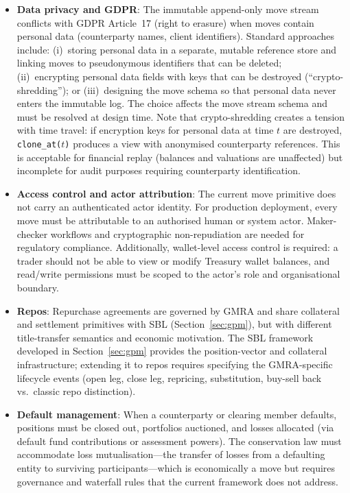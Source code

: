 \documentclass[11pt,a4paper]{article}
\begin{document}
\begin{itemize}
\item \textbf{Data privacy and GDPR}: The immutable append-only move stream conflicts with GDPR Article~17 (right to erasure) when moves contain personal data (counterparty names, client identifiers). Standard approaches include: (i)~storing personal data in a separate, mutable reference store and linking moves to pseudonymous identifiers that can be deleted; (ii)~encrypting personal data fields with keys that can be destroyed (``crypto-shredding''); or (iii)~designing the move schema so that personal data never enters the immutable log. The choice affects the move stream schema and must be resolved at design time. Note that crypto-shredding creates a tension with time travel: if encryption keys for personal data at time $t$ are destroyed, \texttt{clone\_at($t$)} produces a view with anonymised counterparty references. This is acceptable for financial replay (balances and valuations are unaffected) but incomplete for audit purposes requiring counterparty identification.

\item \textbf{Access control and actor attribution}: The current move primitive does not carry an authenticated actor identity. For production deployment, every move must be attributable to an authorised human or system actor. Maker-checker workflows and cryptographic non-repudiation are needed for regulatory compliance. Additionally, wallet-level access control is required: a trader should not be able to view or modify Treasury wallet balances, and read/write permissions must be scoped to the actor's role and organisational boundary.

\item \textbf{Repos}: Repurchase agreements are governed by GMRA and share collateral and settlement primitives with SBL (Section~\ref{sec:gpm}), but with different title-transfer semantics and economic motivation. The SBL framework developed in Section~\ref{sec:gpm} provides the position-vector and collateral infrastructure; extending it to repos requires specifying the GMRA-specific lifecycle events (open leg, close leg, repricing, substitution, buy-sell back vs.\ classic repo distinction).

\item \textbf{Default management}: When a counterparty or clearing member defaults, positions must be closed out, portfolios auctioned, and losses allocated (via default fund contributions or assessment powers). The conservation law must accommodate loss mutualisation---the transfer of losses from a defaulting entity to surviving participants---which is economically a move but requires governance and waterfall rules that the current framework does not address.


\end{itemize}
\end{document}
